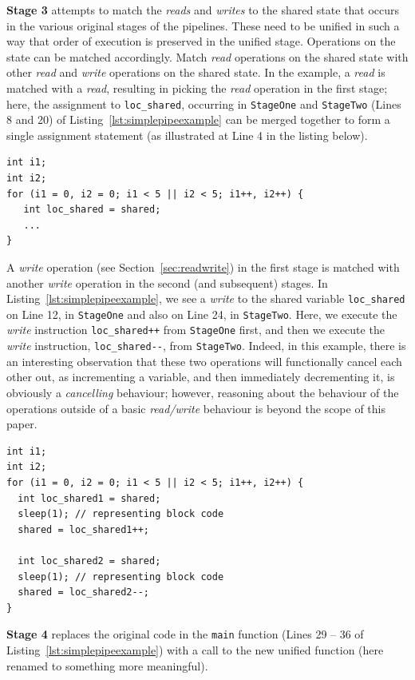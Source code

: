 \textbf{Stage 3} attempts to match the \emph{reads} and \emph{writes} to the shared state that occurs in the various original stages of the pipelines. These need to be unified in such a way that order of execution is preserved in the unified stage. Operations on the state can be matched accordingly. Match \emph{read} operations on the shared state with other \emph{read} and \emph{write} operations on the shared state. In the example, a \emph{read} is matched with a \emph{read}, resulting in picking the \emph{read} operation in the first stage; here, the assignment to \lstinline|loc_shared|, occurring in \lstinline|StageOne| and \lstinline|StageTwo| (Lines 8 and 20) of Listing~\ref{lst:simplepipeexample} can be merged together to form a single assignment statement (as illustrated at Line 4 in the listing below).
\begin{lstlisting}[frame=single]
int i1;
int i2;
for (i1 = 0, i2 = 0; i1 < 5 || i2 < 5; i1++, i2++) {
   int loc_shared = shared;
   ...
}
\end{lstlisting}

A \emph{write} operation (see Section~\ref{sec:readwrite}) in the first stage is matched with another \emph{write} operation in the second (and subsequent) stages. In Listing~\ref{lst:simplepipeexample}, we see a \emph{write} to the shared variable \lstinline|loc_shared| on Line 12, in \lstinline|StageOne| and also on Line 24, in \lstinline|StageTwo|. Here, we execute the \emph{write} instruction \lstinline|loc_shared++| from \lstinline|StageOne| first, and then we execute the \emph{write} instruction, \lstinline|loc_shared--|, from \lstinline|StageTwo|. Indeed, in this example, there is an interesting observation that these two operations will functionally cancel each other out, as incrementing a variable, and then immediately decrementing it, is obviously a \emph{cancelling} behaviour; however, reasoning about the behaviour of the operations outside of a basic \emph{read/write} behaviour is beyond the scope of this paper.

  \begin{lstlisting}[frame=single]
int i1;
int i2;
for (i1 = 0, i2 = 0; i1 < 5 || i2 < 5; i1++, i2++) {
  int loc_shared1 = shared;
  sleep(1); // representing block code
  shared = loc_shared1++;

  int loc_shared2 = shared;
  sleep(1); // representing block code
  shared = loc_shared2--;
}
\end{lstlisting}


\textbf{Stage 4} replaces the original code in the \lstinline{main} function (Lines 29 -- 36 of Listing~\ref{lst:simplepipeexample}) with a call to the new unified function (here renamed to something more meaningful).


